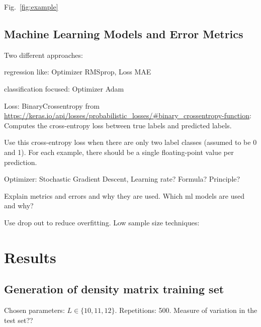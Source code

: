 \documentclass[reprint,amsmath,amssymb,aps,prb]{revtex4-2}
\begin{document}
Fig.~\ref{fig:example}

\subsection{Machine Learning Models and Error Metrics}

Two different approaches:

regression like: Optimizer RMSprop, Loss MAE

classification focused: Optimizer Adam

Loss: BinaryCrossentropy from \url{https://keras.io/api/losses/probabilistic_losses/#binary_crossentropy-function}:
Computes the cross-entropy loss between true labels and predicted labels.

Use this cross-entropy loss when there are only two label classes (assumed to be 0 and 1). For each example, there should be a single floating-point value per prediction.

Optimizer: Stochastic Gradient Descent, Learning rate? Formula? Principle?

Explain metrics and errors and why they are used. Which ml models are used and why?

Use drop out to reduce overfitting. Low sample size techniques:

\section{Results}%

\subsection{Generation of density matrix training set}

Chosen parameters: $L \in \{10, 11, 12\}$. Repetitions: 500. Measure of variation in the test set??
\end{document}
